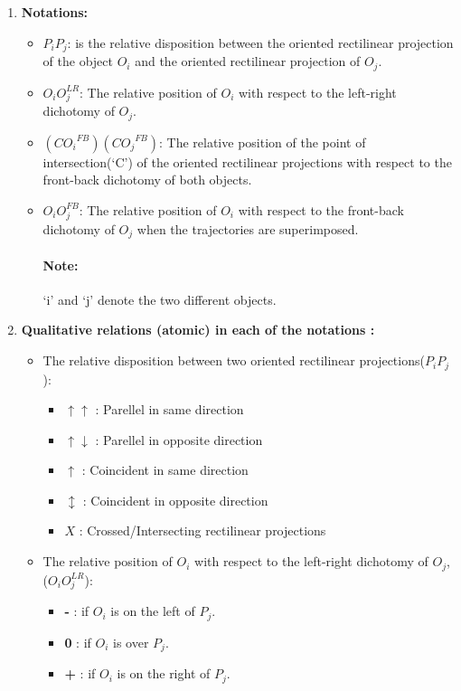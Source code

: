 	\begin{enumerate}
		\item \textbf{Notations:}
		
		\begin{itemize}
			\item $P_iP_j$: is the relative disposition between the oriented rectilinear	projection of the object $O_i$ and the oriented rectilinear projection of $O_j$.
			\item $O_iO_j^{LR}$: The relative position of $O_i$ with respect to the left-right dichotomy of $O_j$.
			\item $({CO_i}^{FB})({CO_j}^{FB})$: The relative position of the point of intersection(`C') of the oriented rectilinear projections with respect to the front-back dichotomy of both objects.
			\item $O_iO_j^{FB}$:  The relative position of $O_i$ with respect to the front-back dichotomy of $O_j$ when the trajectories are superimposed.
			
			\paragraph{Note:} `i' and `j' denote the two different objects.
		\end{itemize}
		
		\item \textbf{Qualitative relations (atomic) in each of the notations :}
		\begin{itemize}
			\item The relative disposition between two oriented rectilinear projections($P_iP_j$):
			
			\begin{itemize}
				\item  $\uparrow \uparrow$  : Parellel in same direction
				\item $\uparrow \downarrow$  : Parellel in opposite direction
				\item $\uparrow$  : Coincident in same direction
				\item $\updownarrow$  : Coincident in opposite direction 
				\item $X$  : Crossed/Intersecting rectilinear projections 
			\end{itemize}
		
			\item The relative position of $O_i$ with respect to the left-right
			dichotomy of $O_j$, ($O_iO_j^{LR}$):
			\begin{itemize}
				\item \textbf{-} : if $O_i$ is on the left of $P_j$.
				\item \textbf{0} : if $O_i$ is over $P_j$.
				\item \textbf{+} : if $O_i$ is on the right of $P_j$.
				

\end{itemize}
\end{itemize}
\end{enumerate}
